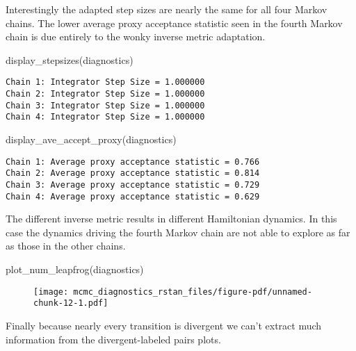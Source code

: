 \documentclass[
  letterpaper,
  DIV=11,
  numbers=noendperiod]{scrartcl}
\newenvironment{Shaded}{\begin{snugshade}}{\end{snugshade}}
\newcommand{\FunctionTok}[1]{\textcolor[rgb]{0.28,0.35,0.67}{#1}}
\newcommand{\NormalTok}[1]{\textcolor[rgb]{0.00,0.23,0.31}{#1}}
\begin{document}
Interestingly the adapted step sizes are nearly the same for all four
Markov chains. The lower average proxy acceptance statistic seen in the
fourth Markov chain is due entirely to the wonky inverse metric
adaptation.

\begin{Shaded}
\begin{Highlighting}[]
\FunctionTok{display\_stepsizes}\NormalTok{(diagnostics)}
\end{Highlighting}
\end{Shaded}

\begin{verbatim}
Chain 1: Integrator Step Size = 1.000000
Chain 2: Integrator Step Size = 1.000000
Chain 3: Integrator Step Size = 1.000000
Chain 4: Integrator Step Size = 1.000000
\end{verbatim}

\begin{Shaded}
\begin{Highlighting}[]
\FunctionTok{display\_ave\_accept\_proxy}\NormalTok{(diagnostics)}
\end{Highlighting}
\end{Shaded}

\begin{verbatim}
Chain 1: Average proxy acceptance statistic = 0.766
Chain 2: Average proxy acceptance statistic = 0.814
Chain 3: Average proxy acceptance statistic = 0.729
Chain 4: Average proxy acceptance statistic = 0.629
\end{verbatim}

The different inverse metric results in different Hamiltonian dynamics.
In this case the dynamics driving the fourth Markov chain are not able
to explore as far as those in the other chains.

\begin{Shaded}
\begin{Highlighting}[]
\FunctionTok{plot\_num\_leapfrog}\NormalTok{(diagnostics)}
\end{Highlighting}
\end{Shaded}

\begin{figure}[H]

{\centering \texttt{[image: mcmc\_diagnostics\_rstan\_files/figure-pdf/unnamed-chunk-12-1.pdf]}

}

\end{figure}

Finally because nearly every transition is divergent we can't extract
much information from the divergent-labeled pairs plots.
\end{document}
